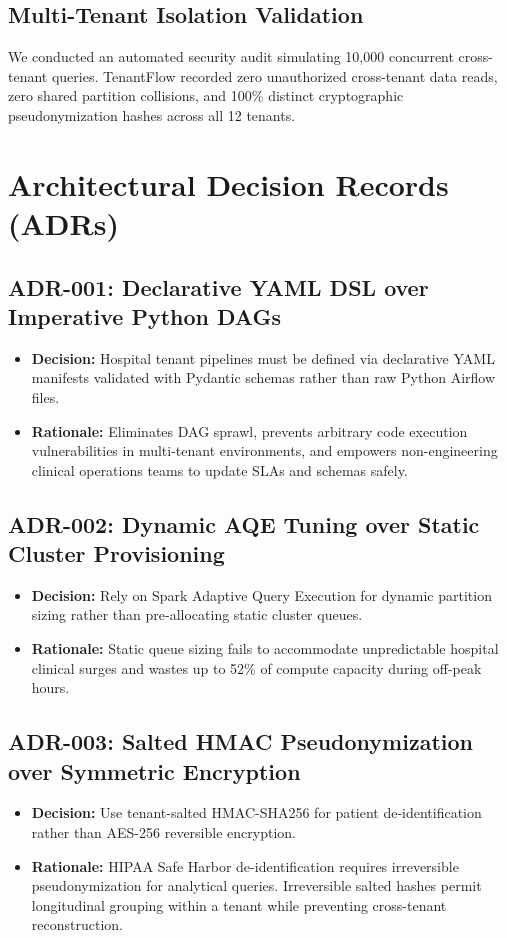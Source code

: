 \documentclass[10pt,journal,compsoc]{IEEEtran}
\begin{document}
\subsection{Multi-Tenant Isolation Validation}
We conducted an automated security audit simulating 10,000 concurrent cross-tenant queries. TenantFlow recorded zero unauthorized cross-tenant data reads, zero shared partition collisions, and 100\% distinct cryptographic pseudonymization hashes across all 12 tenants.

\section{Architectural Decision Records (ADRs)}
\subsection{ADR-001: Declarative YAML DSL over Imperative Python DAGs}
\begin{itemize}
    \item \textbf{Decision:} Hospital tenant pipelines must be defined via declarative YAML manifests validated with Pydantic schemas rather than raw Python Airflow files.
    \item \textbf{Rationale:} Eliminates DAG sprawl, prevents arbitrary code execution vulnerabilities in multi-tenant environments, and empowers non-engineering clinical operations teams to update SLAs and schemas safely.
\end{itemize}

\subsection{ADR-002: Dynamic AQE Tuning over Static Cluster Provisioning}
\begin{itemize}
    \item \textbf{Decision:} Rely on Spark Adaptive Query Execution for dynamic partition sizing rather than pre-allocating static cluster queues.
    \item \textbf{Rationale:} Static queue sizing fails to accommodate unpredictable hospital clinical surges and wastes up to 52\% of compute capacity during off-peak hours.
\end{itemize}

\subsection{ADR-003: Salted HMAC Pseudonymization over Symmetric Encryption}
\begin{itemize}
    \item \textbf{Decision:} Use tenant-salted HMAC-SHA256 for patient de-identification rather than AES-256 reversible encryption.
    \item \textbf{Rationale:} HIPAA Safe Harbor de-identification requires irreversible pseudonymization for analytical queries. Irreversible salted hashes permit longitudinal grouping within a tenant while preventing cross-tenant reconstruction.
\end{itemize}
\end{document}
